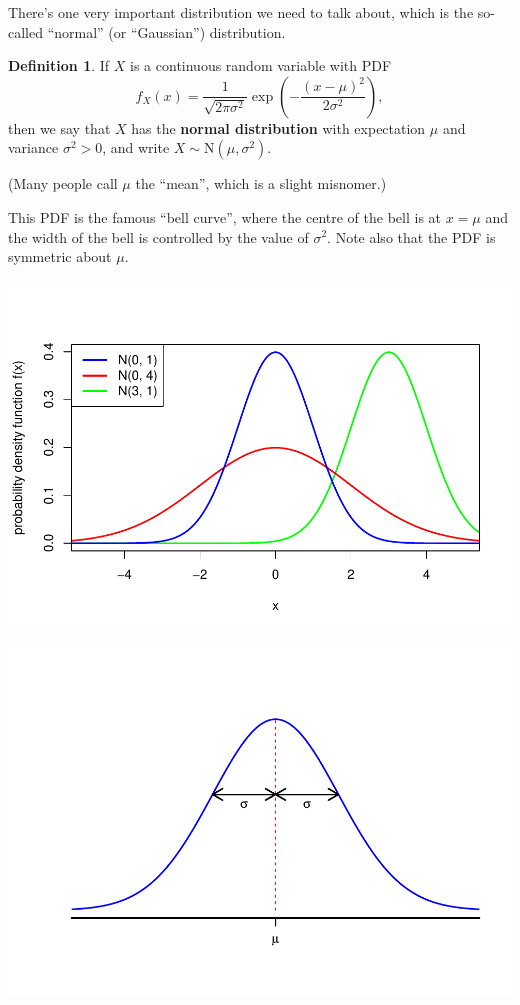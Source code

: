 \documentclass[
  a4paper,
]{book}
\theoremstyle{definition}
\newtheorem{definition}{Definition}[chapter]
\theoremstyle{definition}
\theoremstyle{definition}
\theoremstyle{definition}
\theoremstyle{remark}
\begin{document}
There's one very important distribution we need to talk about, which is the so-called ``normal'' (or ``Gaussian'') distribution.

\begin{definition}
If \(X\) is a continuous random variable with PDF
\[ f_X(x) = \frac{1}{\sqrt{2\pi\sigma^2}} \exp \left( - \frac{(x - \mu)^2}{2\sigma^2} \right) , \]
then we say that \(X\) has the \textbf{normal distribution} with expectation \(\mu\) and variance \(\sigma^2 > 0\), and write \(X \sim \mathrm N(\mu,\sigma^2)\).
\end{definition}

(Many people call \(\mu\) the ``mean'', which is a slight misnomer.)

This PDF is the famous ``bell curve'', where the centre of the bell is at \(x = \mu\) and the width of the bell is controlled by the value of \(\sigma^2\). Note also that the PDF is symmetric about \(\mu\).

\includegraphics{math1710_files/figure-latex/norm-pic-1-1.pdf}

\includegraphics{math1710_files/figure-latex/norm-pic-2-1.pdf}
\end{document}
